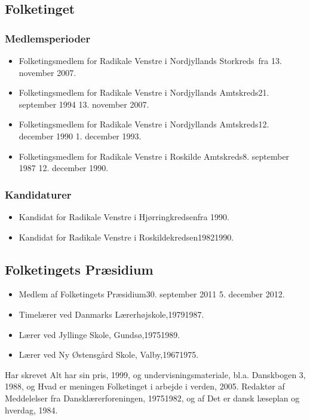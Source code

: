 \documentclass[11pt, a4paper]{awesome-cv}
\begin{document}
\begin{cvletter}
\subsection*{Folketinget}
\subsubsection*{Medlemsperioder}
\begin{itemize}
\item Folketingsmedlem for Radikale Venstre i Nordjyllands Storkreds fra 13. november 2007.
\item Folketingsmedlem for Radikale Venstre i Nordjyllands Amtskreds21. september 1994  13. november 2007.
\item Folketingsmedlem for Radikale Venstre i Nordjyllands Amtskreds12. december 1990  1. december 1993.
\item Folketingsmedlem for Radikale Venstre i Roskilde Amtskreds8. september 1987  12. december 1990.
\end{itemize}
\subsubsection*{Kandidaturer}
\begin{itemize}
\item Kandidat for Radikale Venstre i Hjørringkredsenfra 1990.
\item Kandidat for Radikale Venstre i Roskildekredsen19821990.
\end{itemize}
\subsection*{Folketingets Præsidium}
\begin{itemize}
\item Medlem af Folketingets Præsidium30. september 2011  5. december 2012.
\end{itemize}
\begin{itemize}
\item Timelærer ved Danmarks Lærerhøjskole,19791987.
\item Lærer ved Jyllinge Skole, Gundsø,19751989.
\item Lærer ved Ny Østensgård Skole, Valby,19671975.
\end{itemize}
Har skrevet Alt har sin pris, 1999, og undervisningsmateriale, bl.a. Danskbogen 3, 1988, og Hvad er meningen  Folketinget i arbejde i verden, 2005. Redaktør af Meddelelser fra Dansklærerforeningen, 19751982, og af Det er dansk  læseplan og hverdag, 1984.

\end{cvletter}
\end{document}
